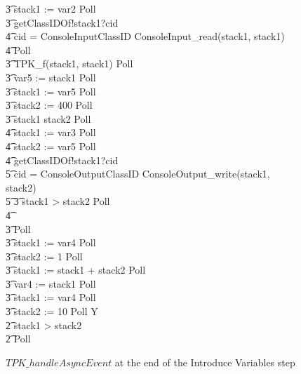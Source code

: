 \begin{figure}[tp!]
\begin{circusaction}
    \t3 stack1 := var2 \circseq Poll \circseq \\
    \t3 getClassIDOf!stack1?cid \then {} \\
    \t4 \circif cid = ConsoleInputClassID \circthen ConsoleInput\_read(stack1, stack1) \circseq \\
    \t4 \circfi \circseq Poll \circseq \\
    \t3 TPK\_f(stack1, stack1) \circseq Poll \circseq \\
    \t3 var5 := stack1 \circseq Poll \circseq \\
    \t3 stack1 := var5 \circseq Poll \circseq \\
    \t3 stack2 := 400 \circseq Poll \circseq \\
    \t3 \circif stack1 \leq stack2 \circthen Poll \circseq \\
    \t4 stack1 := var3 \circseq Poll \circseq \\
    \t4 stack2 := var5 \circseq Poll \circseq \\
    \t4 getClassIDOf!stack1?cid \then {} \\
    \t5 \circif cid = ConsoleOutputClassID \circthen ConsoleOutput\_write(stack1, stack2) \\
    \t5 \circfi
    \t3 {} \circelse stack1 > stack2 \circthen Poll \circseq \\
    \t4 {} \cdots {} \\
    \t3 \circfi \circseq Poll \circseq \\
    \t3 stack1 := var4 \circseq Poll \circseq \\
    \t3 stack2 := 1 \circseq Poll \circseq \\
    \t3 stack1 := stack1 + stack2 \circseq Poll \circseq \\
    \t3 var4 := stack1 \circseq Poll \\
    \t3 stack1 := var4 \circseq Poll \circseq \\
    \t3 stack2 := 10 \circseq Poll \circseq Y \\
    \t2 {} \circelse stack1 > stack2 \circthen \Skip \\
    \t2 \circfi \circseq Poll
  \end{circusaction}
  \caption{$TPK\_handleAsyncEvent$ at the end of the Introduce
    Variables step}
  \label{efs-introduce-variables-example-figure}
\end{figure}

